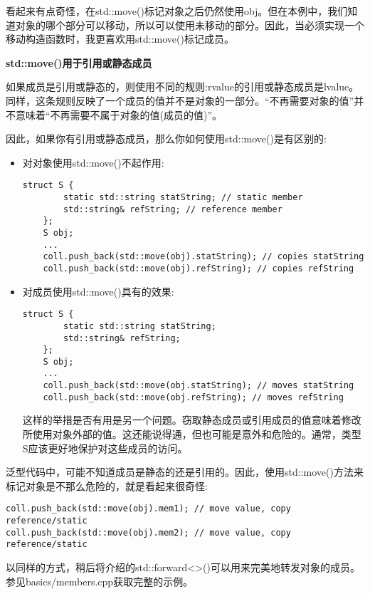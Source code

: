 看起来有点奇怪，在std::move()标记对象之后仍然使用obj。但在本例中，我们知道对象的哪个部分可以移动，所以可以使用未移动的部分。因此，当必须实现一个移动构造函数时，我更喜欢用std::move()标记成员。\par

\hspace*{\fill} \par %
\textbf{std::move()用于引用或静态成员}

如果成员是引用或静态的，则使用不同的规则:rvalue的引用或静态成员是lvalue。同样，这条规则反映了一个成员的值并不是对象的一部分。“不再需要对象的值”并不意味着“不再需要不属于对象的值(成员的值)”。\par

因此，如果你有引用或静态成员，那么你如何使用std::move()是有区别的:\par

\begin{itemize}
	\item 对对象使用std::move()不起作用:\par
	\begin{lstlisting}[caption={}]
	struct S {
		static std::string statString; // static member
		std::string& refString; // reference member
	};
	S obj;
	...
	coll.push_back(std::move(obj).statString); // copies statString
	coll.push_back(std::move(obj).refString); // copies refString
	\end{lstlisting}
	\item 对成员使用std::move()具有的效果:\par
	\begin{lstlisting}[caption={}]
	struct S {
		static std::string statString;
		std::string& refString;
	};
	S obj;
	...
	coll.push_back(std::move(obj.statString); // moves statString
	coll.push_back(std::move(obj.refString); // moves refString
	\end{lstlisting}
	这样的举措是否有用是另一个问题。窃取静态成员或引用成员的值意味着修改所使用对象外部的值。这还能说得通，但也可能是意外和危险的。通常，类型S应该更好地保护对这些成员的访问。\par
\end{itemize}

泛型代码中，可能不知道成员是静态的还是引用的。因此，使用std::move()方法来标记对象是不那么危险的，就是看起来很奇怪:\par

\begin{lstlisting}[caption={}]
coll.push_back(std::move(obj).mem1); // move value, copy reference/static
coll.push_back(std::move(obj).mem2); // move value, copy reference/static
\end{lstlisting}

以同样的方式，稍后将介绍的std::forward<>()可以用来完美地转发对象的成员。参见basics/members.cpp获取完整的示例。\par
























